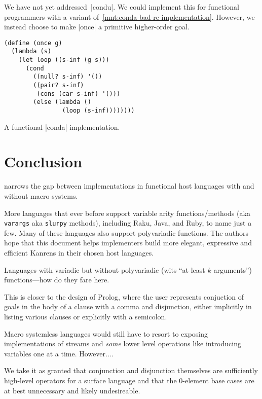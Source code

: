 \documentclass[sigplan,screen,draft,anonymous,review,natbib=false]{acmart}
\begin{document}
We have not yet addressed~\rackinline|condu|. We could implement this
for functional programmers with a variant
of~\cref{mnt:conda-bad-re-implementation}. However, we instead choose
to make \rackinline|once| a primitive higher-order goal.

\begin{listing}
  \begin{verbatim}
(define (once g)
  (lambda (s)
    (let loop ((s-inf (g s)))
      (cond
        ((null? s-inf) '())
        ((pair? s-inf)
         (cons (car s-inf) '()))
        (else (lambda ()
                (loop (s-inf))))))))
  \end{verbatim}
  \caption{A functional \rackinline|conda| implementation.}
  \label{mnt:conda-bad-re-implementation}
\end{listing}

\section{Conclusion}\label{sec:conclusion}

narrows the gap between implementations in functional host languages
with and without macro systems.

More languages that ever before support variable arity
functions/methods (aka \verb|varargs| aka \verb|slurpy| methods),
including Raku, Java, and Ruby, to name just a few. Many of these
languages also support polyvariadic functions. The authors hope that
this document helps implementers build more elegant, expressive and
efficient Kanrens in their chosen host languages.

Languages with variadic but without polyvariadic (wits \enquote{at
  least $k$ arguments}) functions---how do they fare here.

This is closer to the design of Prolog,
where the user represents conjuction of goals in the body of a clause
with a comma and disjunction, either implicitly in listing various
clauses or explicitly with a semicolon.

Macro systemless languages would still have to resort to exposing
implementations of streams and \emph{some} lower level operations like
introducing variables one at a time. However....

We take it as granted that conjunction and disjunction themselves are
sufficiently high-level operators for a surface language and that the
0-element base cases are at best unnecessary and likely undesireable.
\end{document}
